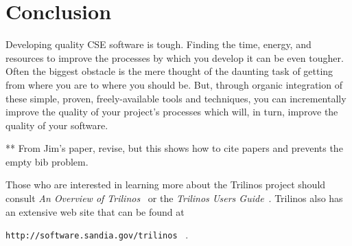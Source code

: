\documentclass[12pt,relax]{article}
\newcommand{\InlineDirectory}[1]{
  {\hspace{0.01 in}} {\tt #1} {\hspace{0.01 in}}}
\begin{document}

\section{Conclusion}
\label{Section:Conclusion}

Developing quality CSE software is tough.  Finding the time, energy, and
resources to improve the processes by which you develop it can be even tougher.
Often the biggest obstacle is the mere thought of the daunting task of getting
from where you are to where you should be.  But, through organic integration of
these simple, proven, freely-available tools and techniques, you can
incrementally improve the quality of your project's processes which will, in
turn, improve the quality of your software.

\clearpage


** From Jim's paper, revise, but this shows how to cite papers and prevents the
empty bib problem.

Those who are interested in learning more about the Trilinos project should 
consult {\it An Overview of Trilinos}~\cite{Trilinos-Overview} or the
{\it Trilinos Users Guide}~\cite{Trilinos-Users-Guide}.  Trilinos also has an 
extensive web site that can be found at \newline
\InlineDirectory{http://software.sandia.gov/trilinos}~\cite{Trilinos-home-page}.

\clearpage



%

\end{document}
